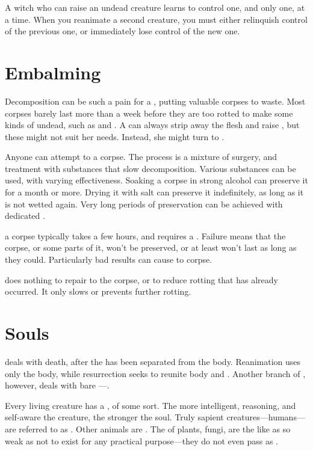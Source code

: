 A witch who can raise an undead creature learns to control one, and only one, at a time.
When you reanimate a second creature, you must either relinquish control of the previous one, or immediately lose control of the new one.

\section{Embalming}

Decomposition can be such a pain for a , putting valuable corpses to waste.
Most corpses barely last more than a week before they are too rotted to make some kinds of undead, such as  and .
A  can always strip away the flesh and raise , but these might not suit her needs.
Instead, she might turn to {\embalming}.

Anyone can attempt to {\embalm} a corpse.
The process is a mixture of surgery, and treatment with substances that slow decomposition.
Various substances can be used, with varying effectiveness.
Soaking a corpse in strong alcohol can preserve it for a month or more.
Drying it with salt can preserve it indefinitely, as long as it is not wetted again.
Very long periods of preservation can be achieved with dedicated .

\capital{\embalming} a corpse typically takes a few hours, and requires a  {\test}.
Failure means that the corpse, or some parts of it, won't be preserved, or at least won't last as long as they could.
Particularly bad results can cause {\damage} to corpse.

\capital{\embalming} does nothing to repair {\damage} to the corpse, or to reduce rotting that has already occurred.
It only slows or prevents further rotting.

\section{Souls}

 deals with death, after the {\soul} has been separated from the body.
Reanimation uses only the body, while resurrection seeks to reunite body and {\soul}.
Another branch of , however, deals with bare {\souls}---{\ghosts}.

Every living creature has a {\soul}, of some sort.
The more intelligent, reasoning, and self-aware the creature, the stronger the soul.
Truly sapient creatures---humans---are referred to as {\strongsouled}.
Other animals are {\weaksouled}.
The {\souls} of plants, fungi, are the like as so weak as not to exist for any practical purpose---they do not even pass as {\weaksouled}.

